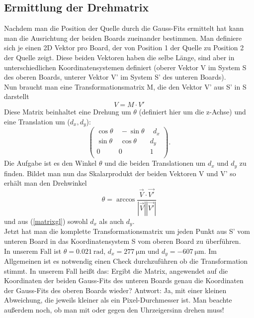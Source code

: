 \documentclass[usenames,dvipsnames]{include/protokollclass}
\begin{document}
	
	{\subsection{Ermittlung der Drehmatrix}}
	Nachdem man die Position der Quelle durch die Gauss-Fits ermittelt hat kann man die Ausrichtung der beiden Boards zueinander bestimmen. Man definiere sich je einen 2D Vektor pro Board, der von Position 1 der Quelle zu Position 2 der Quelle zeigt. Diese beiden Vektoren haben die selbe Länge, sind aber in unterschiedlichen Koordinatensystemen definiert (oberer Vektor V im System S des oberen Boards, unterer Vektor V' im System S' des unteren Boards).\\
	Nun braucht man eine Transformationsmatrix M, die den Vektor V' aus S' in S darstellt
	\begin{equation} \label{matrixgl}
	V=M\cdot V'
	\end{equation}
	Diese Matrix beinhaltet eine Drehung um $\theta$ (definiert hier um die z-Achse) und eine Translation um ($d_x, d_y$):
	\begin{equation*}
	\left( \begin{array}{rrrr}
	\cos \theta  & ~-\sin \theta & ~~d_x  \\
	\sin \theta & ~\cos \theta & d_y  \\
	0 & 0 & 1  \\
	\end{array}\right).
	\end{equation*}
	Die Aufgabe ist es den Winkel $\theta$ und die beiden Translationen um $d_x$ und $d_y$ zu finden.
	Bildet man nun das Skalarprodukt der beiden Vektoren V und V' so erhält man den Drehwinkel
	\begin{equation}
	\theta=\arccos\frac{\vec{V}\cdot \vec{V'}}{|\vec{V}||\vec{V'}|}
	\end{equation}
	und aus (\ref{matrixgl}) sowohl $d_x$ als auch $d_y$.\\
	Jetzt hat man die komplette Transformationsmatrix um jeden Punkt aus S' vom unteren Board in das Koordinatensystem S vom oberen Board zu überführen.\\
	In unserem Fall ist $\theta=\SI{0,021}{\radian}$, $d_x=\SI{277}{\micro\meter}$ und $d_y=\SI{-607}{\micro\meter}$. Im Allgemeinen ist es notwendig einen Check durchzuführen ob die Transformation stimmt. In unserem Fall heißt das: Ergibt die Matrix, angewendet auf die Koordinaten der beiden Gauss-Fits des unteren Boards genau die Koordinaten der Gauss-Fits des oberen Boards wieder? Antwort: Ja, mit einer kleinen Abweichung, die jeweils kleiner als ein Pixel-Durchmesser ist. Man beachte außerdem noch, ob man mit oder gegen den Uhrzeigersinn drehen muss!\\
	
\end{document}

